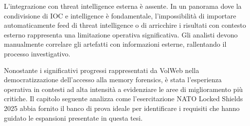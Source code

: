 L'integrazione con threat intelligence esterna è assente. In un panorama dove la condivisione di IOC e intelligence è fondamentale, l'impossibilità di importare automaticamente feed di threat intelligence o di arricchire i risultati con contesto esterno rappresenta una limitazione operativa significativa. Gli analisti devono manualmente correlare gli artefatti con informazioni esterne, rallentando il processo investigativo.

Nonostante i significativi progressi rappresentati da VolWeb nella democratizzazione dell'accesso alla memory forensics, è stata l'esperienza operativa in contesti ad alta intensità a evidenziare le aree di miglioramento più critiche. Il capitolo seguente analizza come l'esercitazione NATO Locked Shields 2025 abbia fornito il banco di prova ideale per identificare i requisiti che hanno guidato le espansioni presentate in questa tesi.